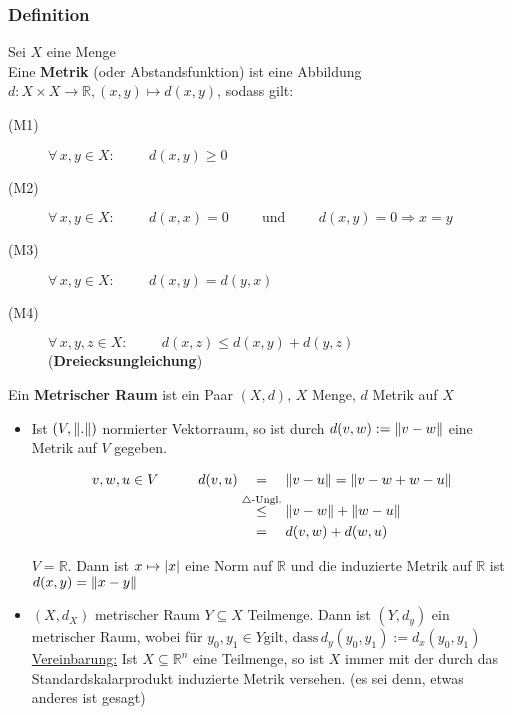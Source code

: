  \subsubsection[Metrik]{Definition} %
 \label{ssub:definition}
Sei $X$ eine Menge \\
Eine {\bfseries Metrik} (oder Abstandsfunktion) ist eine Abbildung $d: X \times X \to \mathbb{R} , (x,y) \mapsto d(x,y)$, sodass gilt:
\begin{description}
	\item[(M1)] $\forall\, x,y \in X: \hspace{1cm}  d(x,y) \geq  0$
	\item[(M2)] $\forall\, x,y \in X: \hspace{1cm}  d(x,x)=0   \hspace{1cm} \text{und} \hspace{1cm} 
		 		d(x,y)=0 \Rightarrow x=y$
	\item[(M3)] $\forall\, x,y \in X: \hspace{1cm} d(x,y)=d(y,x)$
	\item[(M4)] $\forall\, x,y,z \in X: \hspace{1cm}  d(x,z) \leq d(x,y)+d(y,z) \hspace{1cm}$ ({\bfseries Dreiecksungleichung}) 
\end{description}
Ein {\bfseries Metrischer Raum} ist ein Paar $(X,d)$, $X$ Menge, $d$ Metrik auf $X$
\begin{itemize}
	\item Ist $(V,\norm{.})$ normierter Vektorraum, so ist durch $d(v,w):= \norm{v-w}$ eine Metrik auf $ V$ gegeben.

\begin{align*}
	v,w,u \in V \hspace{1cm} d(v,u) &\stackrel{\hphantom{\text{$\triangle$-Ungl.}}}{=}  \norm{v-u} = \norm{v-w+w-u} \\
	&\stackrel{\text{$\triangle$-Ungl.}}{\leq} \norm{v-w} + \norm{w-u} \\ 
	&\stackrel{\hphantom{\text{$\triangle$-Ungl.}}}{=} d(v,w)+d(w,u)
\end{align*}
 
$V=\mathbb{R}$. Dann ist $x \mapsto \lvert x\rvert $ eine Norm auf $\mathbb{R}$ und die induzierte Metrik auf $\mathbb{R}$ ist $d(x,y)=\norm{x-y}$
 \item $(X,d_X)$ metrischer Raum $Y\subseteq X$ Teilmenge. Dann ist $(Y,d_y)$ ein metrischer Raum, wobei für $y_0,y_1 \in Y \text{gilt, dass} \, d_y(y_0,y_1):=d_x(y_0,y_1)$ \\
 \underline{Vereinbarung:} Ist $X \subseteq \mathbb{R}^n$ eine Teilmenge, so ist $X$ immer mit der durch das Standardskalarprodukt induzierte Metrik versehen. (es sei denn, etwas anderes ist gesagt) 
\end{itemize}

